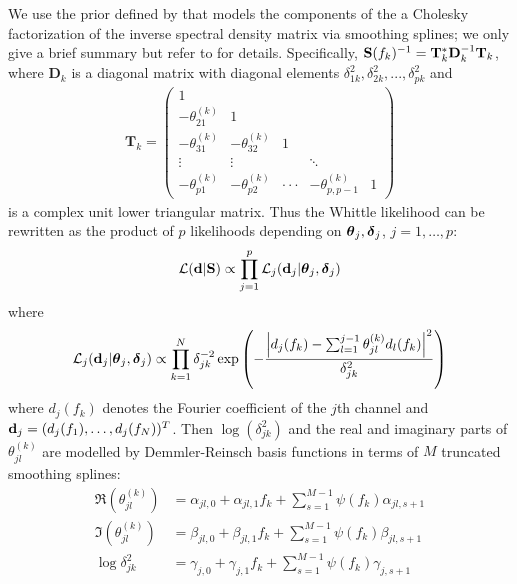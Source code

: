 \documentclass[%
 reprint,
 amsmath,amssymb,
 aps,
]{revtex4-2}
\begin{document}
We use the prior defined by \cite{RosenOri2007Aeom,Hu2023} that models the components of the  a Cholesky factorization of the inverse spectral density matrix  via smoothing splines; we only give a brief summary but refer to \cite{Hu2023} for details.
Specifically, $\S(f_k)^{-1} = \mathbf{T}_k^* \mathbf{D}_k^{-1} \mathbf{T}_k$, where $\mathbf{D}_k$ is a diagonal matrix with diagonal elements $\delta_{1k}^2, \delta_{2k}^2, ..., \delta_{pk}^2$ and
\begin{align*}
\mathbf{T}_k = \begin{pmatrix}1\\-\theta_{21}^{(k)} & 1 \\ -\theta_{31}^{(k)} & -\theta_{32}^{(k)} & 1\\\vdots &\vdots & &\ddots \\
-\theta_{p1}^{(k)} &-\theta_{p2}^{(k)} & \cdot\cdot\cdot& -\theta_{p,p-1}^{(k)} &1
\end{pmatrix}
\end{align*}
is a complex unit lower triangular matrix. Thus the Whittle likelihood can be rewritten as the product of $p$ likelihoods depending on $\btheta_j,\bdelta_j$, $j=1,\ldots,p$:
\begin{align}
 \mathcal{L}(\d|\S)
 \propto \prod_{j=1}^{p} \mathcal{L}_j(\d_j|{\btheta_j,\bdelta_j})
 \label{eq:likelihood}
\end{align}
where
\begin{align}
\mathcal{L}_j(\d_j|\btheta_j,\bdelta_j) \propto \prod_{k=1}^{N} \delta_{jk}^{-2} \exp \left(-\frac{\left|d_j(f_k)-\sum_{l=1}^{j-1}\theta_{jl}^{(k)}d_l(f_k) \right|^2}{\delta_{jk}^2} \right)
\label{eq:likelihoodj}
\end{align}
%
where $d_j(f_k)$ denotes the Fourier coefficient of the $j$th channel and $\d_j=(d_j(f_1),\ldots,d_j(f_N))^T$.
Then  $\log(\delta_{jk}^2)$ and the real and imaginary parts of $\theta_{jl}^{(k)}$ are modelled by Demmler-Reinsch basis functions in terms of $M$ truncated smoothing splines:
\[
\begin{aligned}
\Re(\theta_{jl}^{(k)}) &= \alpha_{jl,0} + \alpha_{jl,1}f_k + \sum_{s=1}^{M-1}\psi(f_k)\alpha_{jl,s+1} \\
\Im(\theta_{jl}^{(k)}) &= \beta_{jl,0} + \beta_{jl,1}f_k + \sum_{s=1}^{M-1}\psi(f_k)\beta_{jl,s+1} \\
\log \delta_{jk}^2 &= \gamma_{j,0} + \gamma_{j,1}f_k + \sum_{s=1}^{M-1}\psi(f_k)\gamma_{j,s+1} \\
\end{aligned}
\]
\end{document}

